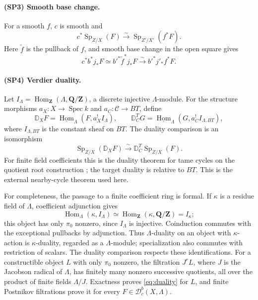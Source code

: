 \documentclass[11pt,a4paper]{article}
\newcommand{\Z}{\mathbf Z}
\newcommand{\Q}{\mathbf Q}
\newcommand{\Spec}{\operatorname{Spec}}
\newcommand{\Sp}{\operatorname{Sp}}
\newcommand{\Hom}{\operatorname{Hom}}
\newcommand{\Dc}{\mathcal D^b_c}
\newcommand{\DD}{\mathbb D}
\newcommand{\cC}{\mathscr C}
\theoremstyle{notes}
\begin{document}
\paragraph{(SP3) Smooth base change.}
For a smooth $f$, $c$ is smooth and
\begin{equation}\label{eq:smooth}
c^*\Sp_{Z/X}(F)\xrightarrow{\sim}\Sp_{Z'/X'}(f^*F).
\end{equation}
Here $\widetilde f$ is the pullback of $f$, and smooth base change in the open square gives
\[
c^*b^*j_*F\simeq b'^*\widetilde f^*j_*F
\xrightarrow{\sim}b'^*j'_*f^*F.
\]

\paragraph{(SP4) Verdier duality.}
Let $I_\Lambda=\Hom_{\Z}(\Lambda,\Q/\Z)$, a discrete injective $\Lambda$-module. For the structure morphisms $a_X:X\to\Spec k$ and $a_C:\cC\to BT$, define
\[
\DD_XF=\underline{\Hom}_\Lambda(F,a_X^!I_\Lambda),\qquad
\DD_C^TG=\underline{\Hom}_\Lambda(G,a_C^!I_{\Lambda,BT}),
\]
where $I_{\Lambda,BT}$ is the constant sheaf on $BT$. The duality comparison is an isomorphism
\begin{equation}\label{eq:duality}
\Sp_{Z/X}(\DD_XF)\xrightarrow{\sim}\DD_C^T\Sp_{Z/X}(F).
\end{equation}
For finite field coefficients this is the duality theorem for tame cycles on the quotient root construction \cite[Theorem 8.5]{CP}; the target duality is relative to $BT$. This is the external nearby-cycle theorem used here.

For completeness, the passage to a finite coefficient ring is formal. If $\kappa$ is a residue field of $\Lambda$, coefficient adjunction gives
\[
\Hom_\Lambda(\kappa,I_\Lambda)\simeq
\Hom_\Z(\kappa,\Q/\Z)=I_\kappa;
\]
this object has only $\pi_0$ nonzero, since $I_\Lambda$ is injective. Coinduction commutes with the exceptional pullbacks by adjunction. Thus $\Lambda$-duality on an object with $\kappa$-action is $\kappa$-duality, regarded as a $\Lambda$-module; specialization also commutes with restriction of scalars. The duality comparison respects these identifications. For a constructible object $L$ with only $\pi_0$ nonzero, the filtration $J^rL$, where $J$ is the Jacobson radical of $\Lambda$, has finitely many nonzero successive quotients, all over the product of finite fields $\Lambda/J$. Exactness proves \eqref{eq:duality} for $L$, and finite Postnikov filtrations prove it for every $F\in\Dc(X,\Lambda)$.
\end{document}
